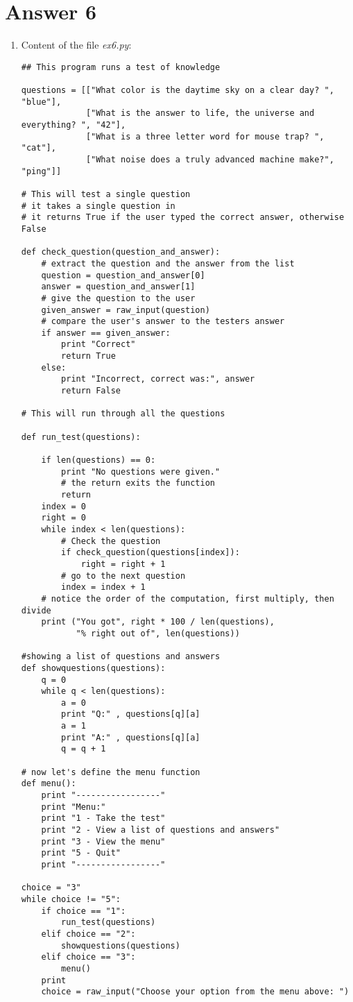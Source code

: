 \documentclass[11pt,a4paper]{article}
\begin{document}
\section*{Answer 6}
\begin{enumerate}
\item Content of the file {\it ex6.py}:
\begin{verbatim}
## This program runs a test of knowledge
 
questions = [["What color is the daytime sky on a clear day? ", "blue"],
             ["What is the answer to life, the universe and everything? ", "42"],
             ["What is a three letter word for mouse trap? ", "cat"],
             ["What noise does a truly advanced machine make?", "ping"]]
 
# This will test a single question
# it takes a single question in
# it returns True if the user typed the correct answer, otherwise False
 
def check_question(question_and_answer):
    # extract the question and the answer from the list
    question = question_and_answer[0]
    answer = question_and_answer[1]
    # give the question to the user
    given_answer = raw_input(question)
    # compare the user's answer to the testers answer
    if answer == given_answer:
        print "Correct"
        return True
    else:
        print "Incorrect, correct was:", answer
        return False
 
# This will run through all the questions
 
def run_test(questions):
 
    if len(questions) == 0:
        print "No questions were given."
        # the return exits the function
        return
    index = 0
    right = 0
    while index < len(questions):
        # Check the question
        if check_question(questions[index]):
            right = right + 1
        # go to the next question
        index = index + 1
    # notice the order of the computation, first multiply, then divide
    print ("You got", right * 100 / len(questions),
           "% right out of", len(questions))
 
#showing a list of questions and answers
def showquestions(questions):
    q = 0
    while q < len(questions):
        a = 0
        print "Q:" , questions[q][a]
        a = 1
        print "A:" , questions[q][a]
        q = q + 1
 
# now let's define the menu function
def menu():
    print "-----------------"
    print "Menu:"
    print "1 - Take the test"
    print "2 - View a list of questions and answers"
    print "3 - View the menu"
    print "5 - Quit"
    print "-----------------"
 
choice = "3"
while choice != "5":
    if choice == "1":
        run_test(questions)
    elif choice == "2":
        showquestions(questions)
    elif choice == "3":
        menu()
    print
    choice = raw_input("Choose your option from the menu above: ")
\end{verbatim}
\end{enumerate}
\end{document}
